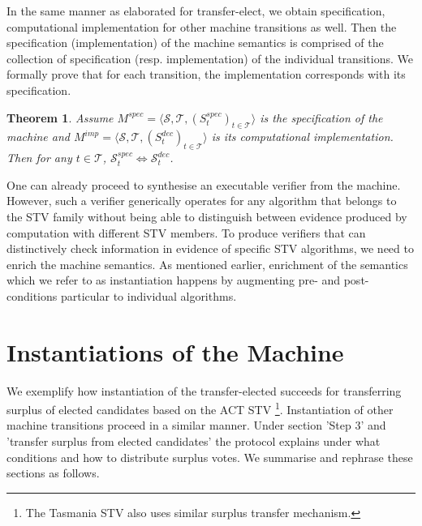 \documentclass[10pt,conference]{IEEEtran}
\newtheorem{theorem}{Theorem}
\begin{document}
In the same manner as elaborated for transfer-elect, we obtain specification, computational implementation for other machine transitions as well. Then the specification (implementation) of the machine semantics is comprised of the collection of specification (resp. implementation) of the individual transitions. We formally prove that for each transition, the implementation corresponds with its specification.

\begin{theorem}
Assume $M^{spec} = \langle \mathcal{S}, \mathcal{T}, (S_{t}^{spec})_{t \in \mathcal{T}} \rangle$ is the specification of the machine and  $M^{imp} = \langle \mathcal{S}, \mathcal{T}, (S_{t}^{dec})_{t \in \mathcal{T}} \rangle$ is its computational implementation. Then for any $t\in\mathcal{T}$,  $\mathcal{S}_{t}^{spec}\Leftrightarrow\mathcal{S}_{t}^{dec}$.      
\end{theorem}




One can already proceed to synthesise an executable verifier from the machine. However, such a verifier  generically operates for any algorithm that belongs to the STV family without being able to distinguish between evidence produced by computation with different STV members. To produce verifiers that can distinctively check information in evidence of specific STV algorithms, we need to enrich the machine semantics. As mentioned earlier, enrichment of the semantics which we refer to as instantiation happens by augmenting pre- and post-conditions particular to individual algorithms. %

\section{Instantiations of the Machine}\label{sec:InstMachine}
We exemplify how instantiation of the transfer-elected succeeds for transferring surplus of elected candidates based on the ACT STV
\footnote{The Tasmania STV also uses similar surplus transfer mechanism.}. Instantiation of other machine transitions proceed in a  similar manner.    
Under section 'Step 3' and 'transfer surplus from elected candidates' the protocol explains under what conditions and how to distribute surplus votes. We summarise and rephrase these sections as follows. 
\end{document}
